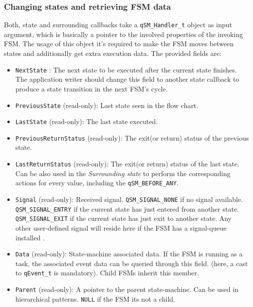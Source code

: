 \subsubsection{Changing states and retrieving FSM data} \label{qsmhandlerfields} 
Both, state and surrounding callbacks take a \lstinline{qSM_Handler_t}  object as input argument, which is basically a pointer to the involved properties of the invoking FSM. The usage of this object it's required to make the FSM moves between states and additionally get extra execution data. The provided fields are:

\begin{itemize}
    \item \lstinline{NextState} : The next state to be executed after the current state finishes. The application writer should change this field to another state callback to produce a state transition in the next FSM's cycle.
    \item \lstinline{PreviousState} (read-only):  Last state seen in the flow chart.
    \item \lstinline{LastState} (read-only):  The last state executed.
    \item \lstinline{PreviousReturnStatus} (read-only): The exit(or return) status of the previous state.
    \item \lstinline{LastReturnStatus} (read-only): The exit(or return) status of the last state. Can be also used in the \textit{Surrounding state} to perform the corresponding actions for every value, including the \lstinline{qSM_BEFORE_ANY}.
    \item \lstinline{Signal} (read-only): Received signal. \lstinline{QSM_SIGNAL_NONE} if no signal available. \lstinline{QSM_SIGNAL_ENTRY} if the current state has just entered from another state. \lstinline{QSM_SIGNAL_EXIT} if the current state has just exit to another state. Any other user-defined signal will reside here if the FSM has a signal-queue installed . 
    \item \lstinline{Data} (read-only): State-machine associated data. If the FSM is running as a task, the associated event data can be queried through this field. (here, a cast to \lstinline{qEvent_t} is mandatory). Child FSMs inherit this member.
    \item \lstinline{Parent} (read-only): A pointer to the parent state-machine. Can be used in hierarchical  patterns. \lstinline{NULL} if the FSM its not a child.
\end{itemize}

